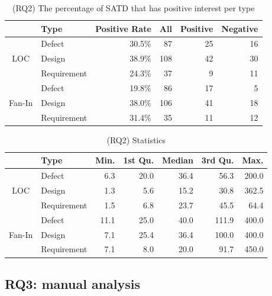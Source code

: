 \begin{table}[tb]
  \caption{(RQ2) The percentage of SATD that has positive interest per type}
  \label{tab:percentage_type}
  \centering

  \begin{tabular}{cl|r|rrr}
  \hline
      &  Type & Positive Rate & All & Positive & Negative \\
  \hline
        & Defect & 30.5\% &  87 &  25  &  16 \\
   LOC  & Design & 38.9\% & 108 &  42  &  30 \\
        & Requirement & 24.3\% & 37 & 9 & 11 \\
  \hline
        & Defect    & 19.8\% & 86 & 17  &   5 \\
Fan-In  & Design & 38.0\% & 106 &  41  &   18 \\
        & Requirement  & 31.4\% & 35 & 11 & 12 \\
  \hline
  \end{tabular}
\end{table}

\begin{table}[tb]
  \caption{(RQ2) Statistics}
  \label{tab:statistic_type}
  \centering

  \begin{tabular}{cl|rrrrr}
  \hline
      &  Type & Min. & 1st Qu. & Median & 3rd Qu. & Max. \\
  \hline
        & Defect    & 6.3 &  20.0 &  36.4  &   56.3 &  200.0 \\
   LOC  & Design & 1.3 &   5.6 &  15.2  &   30.8 & 362.5 \\
        & Requirement  & 1.5 &   6.8 &  23.7  &   45.5 &  64.4 \\
  \hline
        & Defect    & 11.1 &  25.0 &  40.0  & 111.9 & 400.0 \\
Fan-In  & Design & 7.1 &  25.4 &  36.4  &  100.0 &  400.0 \\
        & Requirement  & 7.1 &  8.0 &  20.0  &  91.7 &  450.0 \\
  \hline
  \end{tabular}
\end{table}


\subsection{RQ3: manual analysis}


